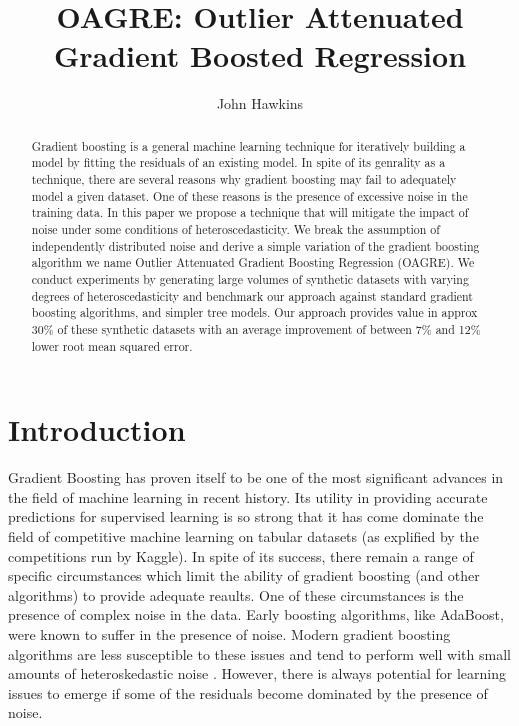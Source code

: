 \documentclass[12pt,a4paper]{article}
\begin{document}
\title{OAGRE: Outlier Attenuated Gradient Boosted Regression}

\author{John Hawkins}


\maketitle

\begin{abstract}

Gradient boosting is a general machine learning technique for iteratively building 
a model by fitting the residuals of an existing model.
In spite of its genrality as a technique, there are several reasons why gradient
boosting may fail to adequately model a given dataset. One of these reasons is the presence of 
excessive noise in the training data. In this paper we propose a technique that will
mitigate the impact of noise under some conditions of heteroscedasticity.
We break the assumption of independently distributed noise and derive a simple variation of
the gradient boosting algorithm we name Outlier Attenuated Gradient Boosting Regression (OAGRE).
We conduct experiments by generating large volumes of synthetic datasets with varying
degrees of heteroscedasticity and benchmark our approach against standard gradient
boosting algorithms, and simpler tree models. 
Our approach provides value in approx 30\% of these synthetic datasets with an average improvement
of between 7\% and 12\% lower root mean squared error.

\end{abstract}

\section{Introduction}

Gradient Boosting has proven itself to be one of the most significant advances in
the field of machine learning in recent history. Its utility in providing accurate predictions
for supervised learning is so strong that it has come dominate the field of competitive machine 
learning on tabular datasets (as explified by the competitions run by Kaggle\cite{kaggle}).
In spite of its success, there remain a range of specific circumstances which limit the ability of
gradient boosting (and other algorithms) to provide adequate reaults. One of these
circumstances is the presence of complex noise in the data.
Early boosting algorithms, like AdaBoost, were known
to suffer in the presence of noise\cite{Freund2001,Schapire2003}. Modern gradient boosting
algorithms are less susceptible to these issues and tend to perform well with small amounts of
heteroskedastic noise \cite{brophy2022}. However, there is always potential for learning issues
to emerge if some of the residuals become dominated by the presence of noise.
\end{document}
